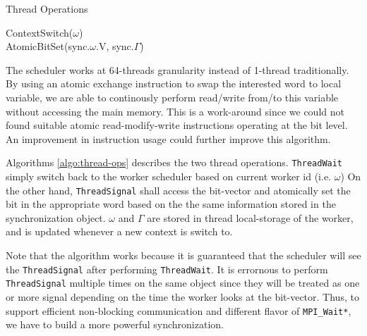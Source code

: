 \begin{algorithm}
  \caption{Thread Operations}
  \label{algo:thread-ops}
  \begin{algorithmic}[1]
      \State ContextSwitch($\omega$)
    \EndProcedure
    \\ 
      \State AtomicBitSet(sync.$\omega$.V, sync.$\Gamma$)
    \EndProcedure
  \end{algorithmic}
\end{algorithm}

The scheduler works at 64-threads granularity instead of 1-thread
traditionally.  By using an atomic exchange instruction to swap the interested
word to local variable, we are able to continously perform read/write from/to
this variable without accessing the main memory. This is a work-around since we
could not found suitable atomic read-modify-write instructions operating at the bit
level. An improvement in instruction usage could further improve this algorithm.

Algorithms \ref{algo:thread-ops} describes the two thread operations.
\texttt{ThreadWait} simply switch back to the worker scheduler based on current
worker id (i.e. $\omega$) On the other hand, \texttt{ThreadSignal} shall access
the bit-vector and atomically set the bit in the appropriate word based on the
the same information stored in the synchronization object. $\omega$ and
$\Gamma$ are stored in thread local-storage of the worker, and is updated
whenever a new context is switch to.

Note that the algorithm works because it is guaranteed that the scheduler will
see the \texttt{ThreadSignal} after performing \texttt{ThreadWait}.  It is
errornous to perform \texttt{ThreadSignal} multiple times on the same object
since they will be treated as one or more signal depending on the time the
worker looks at the bit-vector. Thus, to support efficient non-blocking
communication and different flavor of \texttt{MPI_Wait*}, we have to build a
more powerful synchronization.  

